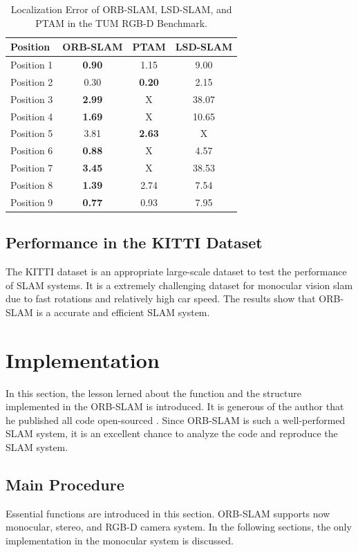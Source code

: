 \documentclass[letterpaper, 10 pt, conference]{ieeeconf}  %
\begin{document}
\begin{table}[h!]
\caption{Localization Error of ORB-SLAM, LSD-SLAM, and PTAM in the  TUM RGB-D Benchmark.}
\label{TUM Dataset}
\centering
\begin{tabular}{ l c c c } 
\hline
 \hline
 Position & ORB-SLAM & PTAM & LSD-SLAM\\ 
 \hline
 Position 1	& \textbf{0.90} & 1.15 & 9.00\\ 
 Position 2	& 0.30 & \textbf{0.20} & 2.15\\ 
 Position 3	& \textbf{2.99} & X & 38.07\\ 
 Position 4 & \textbf{1.69} & X & 10.65\\ 
 Position 5	& 3.81 & \textbf{2.63} & X\\ 
 Position 6 & \textbf{0.88} & X & 4.57\\ 
 Position 7 & \textbf{3.45} & X & 38.53\\
 Position 8 & \textbf{1.39} & 2.74 & 7.54\\
 Position 9 & \textbf{0.77} & 0.93 & 7.95\\
\hline
 \hline
\end{tabular}
\end{table}
%

\subsection{Performance in the KITTI Dataset \cite{40}}
The KITTI dataset is an appropriate large-scale dataset to test the performance of SLAM systems. It is a extremely challenging dataset for monocular vision slam due to fast rotations and relatively high car speed. The results show that ORB-SLAM is a accurate and efficient SLAM system.


\section{Implementation} 
In this section, the lesson lerned about the function and the structure implemented in the ORB-SLAM is introduced. It is generous of the author that he published all code open-sourced \cite{ORB2}. Since ORB-SLAM is such a well-performed SLAM system, it is an excellent chance to analyze the code and reproduce the SLAM system. 

\subsection{Main Procedure}
Essential functions are introduced in this section. ORB-SLAM supports now monocular, stereo, and RGB-D camera system. In the following sections, the only implementation in the monocular system is discussed.
\end{document}
